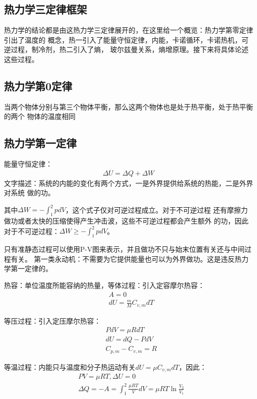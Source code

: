 \documentclass[UTF8]{article}
\numberwithin{equation}{section}
\begin{document}
\subsection{热力学三定律框架}
热力学的结论都是由这热力学三定律展开的，在这里给一个概览：热力学第零定律引出了温度的
概念，热一引入了能量守恒定律，内能，卡诺循环，卡诺热机，可逆过程，制冷剂，热二引入了熵，
玻尔兹曼关系，熵增原理。接下来将具体论述这些过程。
\subsection{热力学第0定律}
当两个物体分别与第三个物体平衡，那么这两个物体也是处于热平衡，处于热平衡的两个
物体的温度相同
\subsection{热力学第一定律}
能量守恒定律：
\begin{align*}
    \Delta U = \Delta Q +\Delta W
\end{align*}
文字描述：系统的内能的变化有两个方式，一是外界提供给系统的热能，二是外界对系统
做的功。

其中$\Delta W = -\int_1^2 pdV$，这个式子仅对可逆过程成立。对于不可逆过程
还有摩擦力做功或者太快的压缩使得产生冲击波，这些不可逆过程都会产生额外
的功，因此对于不可逆过程：$\Delta W \geq -\int_1 ^2 pdV$。

只有准静态过程可以使用P-V图来表示，并且做功不只与始末位置有关还与中间过程有关。
第一类永动机：不需要为它提供能量也可以为外界做功。这是违反热力学第一定律的。

热容：单位温度所能容纳的热量，等体过程：引入定容摩尔热容：
\begin{align*}
    &A=0\\
    &dU=\frac{m}{M}C_{v,m}dT
\end{align*}

等压过程：引入定压摩尔热容：
\begin{align*}
    &PdV=\mu R dT\\
    &dU=dQ-PdV\\
    &C_{p,m}-C_{v,m}=R
\end{align*}

等温过程：内能只与温度和分子热运动有关$dU=\mu C_{v,m} dT$，因此：
\begin{align*}
    &PV=\mu RT,\Delta U=0\\
    &\Delta Q = -A=\int_1^2 \frac{\mu RT}{V}dV=\mu RT\ln \frac{V_2}{V_1}    
\end{align*}
\end{document}
